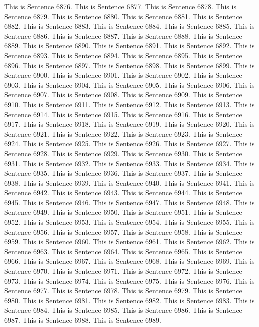 \documentclass{article}
\begin{document}
This is Sentence 6876.
This is Sentence 6877.
This is Sentence 6878.
This is Sentence 6879.
This is Sentence 6880.
This is Sentence 6881.
This is Sentence 6882.
This is Sentence 6883.
This is Sentence 6884.
This is Sentence 6885.
This is Sentence 6886.
This is Sentence 6887.
This is Sentence 6888.
This is Sentence 6889.
This is Sentence 6890.
This is Sentence 6891.
This is Sentence 6892.
This is Sentence 6893.
This is Sentence 6894.
This is Sentence 6895.
This is Sentence 6896.
This is Sentence 6897.
This is Sentence 6898.
This is Sentence 6899.
This is Sentence 6900.
This is Sentence 6901.
This is Sentence 6902.
This is Sentence 6903.
This is Sentence 6904.
This is Sentence 6905.
This is Sentence 6906.
This is Sentence 6907.
This is Sentence 6908.
This is Sentence 6909.
This is Sentence 6910.
This is Sentence 6911.
This is Sentence 6912.
This is Sentence 6913.
This is Sentence 6914.
This is Sentence 6915.
This is Sentence 6916.
This is Sentence 6917.
This is Sentence 6918.
This is Sentence 6919.
This is Sentence 6920.
This is Sentence 6921.
This is Sentence 6922.
This is Sentence 6923.
This is Sentence 6924.
This is Sentence 6925.
This is Sentence 6926.
This is Sentence 6927.
This is Sentence 6928.
This is Sentence 6929.
This is Sentence 6930.
This is Sentence 6931.
This is Sentence 6932.
This is Sentence 6933.
This is Sentence 6934.
This is Sentence 6935.
This is Sentence 6936.
This is Sentence 6937.
This is Sentence 6938.
This is Sentence 6939.
This is Sentence 6940.
This is Sentence 6941.
This is Sentence 6942.
This is Sentence 6943.
This is Sentence 6944.
This is Sentence 6945.
This is Sentence 6946.
This is Sentence 6947.
This is Sentence 6948.
This is Sentence 6949.
This is Sentence 6950.
This is Sentence 6951.
This is Sentence 6952.
This is Sentence 6953.
This is Sentence 6954.
This is Sentence 6955.
This is Sentence 6956.
This is Sentence 6957.
This is Sentence 6958.
This is Sentence 6959.
This is Sentence 6960.
This is Sentence 6961.
This is Sentence 6962.
This is Sentence 6963.
This is Sentence 6964.
This is Sentence 6965.
This is Sentence 6966.
This is Sentence 6967.
This is Sentence 6968.
This is Sentence 6969.
This is Sentence 6970.
This is Sentence 6971.
This is Sentence 6972.
This is Sentence 6973.
This is Sentence 6974.
This is Sentence 6975.
This is Sentence 6976.
This is Sentence 6977.
This is Sentence 6978.
This is Sentence 6979.
This is Sentence 6980.
This is Sentence 6981.
This is Sentence 6982.
This is Sentence 6983.
This is Sentence 6984.
This is Sentence 6985.
This is Sentence 6986.
This is Sentence 6987.
This is Sentence 6988.
This is Sentence 6989.
\end{document}
